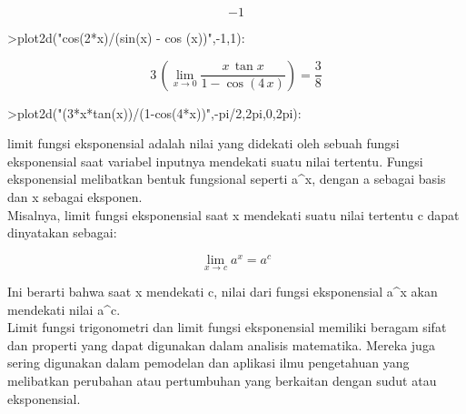 \documentclass[a4paper,10pt]{article}
\begin{document}
\begin{eulernotebook}
\begin{eulercomment}
\begin{eulercomment}
\begin{eulercomment}
\begin{eulercomment}
\begin{eulercomment}
\begin{eulercomment}
\begin{eulercomment}
\begin{eulercomment}
\begin{eulercomment}
\begin{eulercomment}
\begin{eulerformula}
\[ -1
\]
\end{eulerformula}
\begin{eulerprompt}
>plot2d("cos(2*x)/(sin(x) - cos (x))",-1,1):
\end{eulerprompt}
\begin{eulerformula}
\[
3\,\left(\lim_{x\rightarrow 0}{\frac{x\,\tan x}{1-\cos \left(4\,x
 \right)}}\right)=\frac{3}{8}
\]
\end{eulerformula}
\begin{eulerprompt}
>plot2d("(3*x*tan(x))/(1-cos(4*x))",-pi/2,2pi,0,2pi):
\end{eulerprompt}
\begin{eulercomment}
limit fungsi eksponensial adalah nilai yang didekati oleh sebuah
fungsi eksponensial saat variabel inputnya mendekati suatu nilai
tertentu. Fungsi eksponensial melibatkan bentuk fungsional seperti
a\textasciicircum{}x, dengan a sebagai basis dan x sebagai eksponen.\\
Misalnya, limit fungsi eksponensial saat x mendekati suatu nilai
tertentu c dapat dinyatakan sebagai:

\end{eulercomment}
\begin{eulerformula}
\[
\lim_{x \to c} a^x = a^c
\]
\end{eulerformula}
\begin{eulercomment}
Ini berarti bahwa saat x mendekati c, nilai dari fungsi eksponensial
a\textasciicircum{}x akan mendekati nilai a\textasciicircum{}c.\\
Limit fungsi trigonometri dan limit fungsi eksponensial memiliki
beragam sifat dan properti yang dapat digunakan dalam analisis
matematika. Mereka juga sering digunakan dalam pemodelan dan aplikasi
ilmu pengetahuan yang melibatkan perubahan atau pertumbuhan yang
berkaitan dengan sudut atau eksponensial.


\end{eulercomment}
\end{eulercomment}
\end{eulercomment}
\end{eulercomment}
\end{eulercomment}
\end{eulercomment}
\end{eulercomment}
\end{eulercomment}
\end{eulercomment}
\end{eulercomment}
\end{eulercomment}
\end{eulernotebook}
\end{document}
